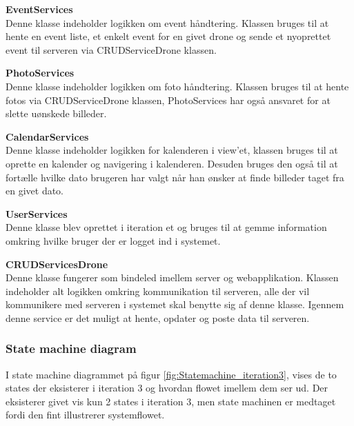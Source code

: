 \textbf{EventServices}\\
Denne klasse indeholder logikken om event håndtering. Klassen bruges til at hente en event liste, et enkelt event for en givet drone og sende et nyoprettet event til serveren via CRUDServiceDrone klassen.

\textbf{PhotoServices}\\
Denne klasse indeholder logikken om foto håndtering. Klassen bruges til at hente fotos via CRUDServiceDrone klassen, PhotoServices har også ansvaret for at slette uønskede billeder.
\newpage

\textbf{CalendarServices}\\
Denne klasse indeholder logikken for kalenderen i view'et, klassen bruges til at oprette en kalender og navigering i kalenderen. Desuden bruges den også til at fortælle hvilke dato brugeren har valgt når han ønsker at finde billeder taget fra en givet dato.

\textbf{UserServices}\\
Denne klasse blev oprettet i iteration et og bruges til at gemme information omkring hvilke bruger der er logget ind i systemet.

\textbf{CRUDServicesDrone}\\
Denne klasse fungerer som bindeled imellem server og webapplikation. Klassen indeholder alt logikken omkring kommunikation til serveren, alle der vil kommunikere med serveren i systemet skal benytte sig af denne klasse. Igennem denne service er det muligt at hente, opdater og poste data til serveren.

\vspace{0.3cm}

\subsubsection*{State machine diagram}
\vspace{-0.3cm}
I state machine diagrammet på figur \ref{fig:Statemachine_iteration3}, vises de to states der eksisterer i iteration 3 og hvordan flowet imellem dem ser ud. Der eksisterer givet vis kun 2 states i iteration 3, men state machinen er medtaget fordi den fint illustrerer systemflowet.

